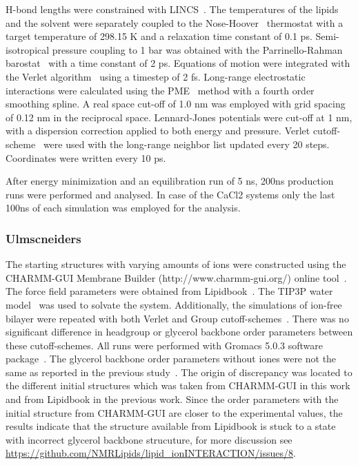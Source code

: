 \documentclass[pre,aps,floatfix,authordate1-4,twocolumn]{revtex4-1}
\begin{document}
H-bond lengths were constrained with LINCS~\cite{hess97,hess07}. The temperatures of the lipids and the solvent were separately coupled to the 
Nose-Hoover~\cite{nose84,hoover85} thermostat with a target temperature of 298.15 K and a relaxation time constant of 0.1 ps. Semi-isotropical pressure 
coupling to 1 bar was obtained with the Parrinello-Rahman barostat~\cite{parrinello81} with a time constant of 2 ps. Equations of motion were integrated 
with the Verlet algorithm~\cite{pall13} using a timestep of 2 fs. Long-range electrostatic interactions were calculated using the PME~\cite{darden93,essman95} method 
with a fourth order smoothing spline. A real space cut-off of 1.0 nm was employed with grid spacing of 0.12 nm in the reciprocal space. 
Lennard-Jones potentials were cut-off at 1 nm, with a dispersion correction applied to both energy and pressure. Verlet cutoff-scheme~\cite{pall13} 
were used with the long-range neighbor list updated every 20 steps. Coordinates were written every 10 ps.

After energy minimization and an equilibration run of 5 ns, 200ns production runs were performed and analysed. In case of the CaCl2 systems 
only the last 100ns of each simulation was employed for the analysis.

\subsubsection{Ulmscneiders}
The starting structures with varying amounts of ions were constructed using the CHARMM-GUI Membrane Builder (http://www.charmm-gui.org/) 
online tool~\cite{lee15}. The force field parameters were obtained from Lipidbook~\cite{domanski10}. The TIP3P water model~\cite{jorgensen83} 
was used to solvate the system.  Additionally, the simulations of ion-free bilayer were repeated with both Verlet and Group cutoff-schemes~\cite{ulmschneiderPOPC0mMNaClfiles}. 
There was no significant difference in headgroup or glycerol backbone order parameters between these cutoff-schemes. All runs were performed with Gromacs 5.0.3 software package~\cite{abraham15}. 
The glycerol backbone order parameters without iones were not the same as reported in the previous study~\cite{botan15}.
The origin of discrepancy was located to the different initial structures which was taken from CHARMM-GUI in this work
and from Lipidbook in the previous work. Since the order parameters with the initial structure from CHARMM-GUI are
closer to the experimental values, the results indicate that the structure available from Lipidbook is stuck to a
state with incorrect glycerol backbone strucuture, for more discussion see \url{https://github.com/NMRLipids/lipid_ionINTERACTION/issues/8}.
\end{document}
